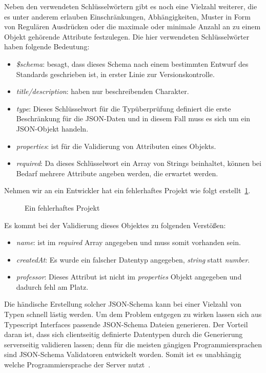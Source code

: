 Neben den verwendeten Schlüsselwörtern gibt es noch eine Vielzahl weiterer, die es unter anderem erlauben Einschränkungen, Abhängigkeiten,
Muster in Form von Regulären Ausdrücken oder die maximale oder minimale Anzahl an zu einem Objekt gehörende Attribute festzulegen.
Die hier verwendeten Schlüsselwörter haben folgende Bedeutung:

\begin{itemize}
    \label{basics:jsonschema:items}
    \item \emph{\$schema}: besagt, dass dieses Schema nach einem bestimmten Entwurf des Standards geschrieben ist, in erster Linie zur Versionskontrolle.
    \item \emph{title/description}: haben nur beschreibenden Charakter.
    \item \emph{type}: Dieses Schlüsselwort für die Typüberprüfung definiert die erste Beschränkung für die JSON-Daten und in diesem Fall muss es sich um ein JSON-Objekt handeln.
    \item \emph{properties}: ist für die Validierung von Attributen eines Objekts.
    \item \emph{required}: Da dieses Schlüsselwort ein Array von Strings beinhaltet, können bei Bedarf mehrere Attribute angeben werden, die erwartet werden.
\end{itemize}

Nehmen wir an ein Entwickler hat ein fehlerhaftes Projekt wie folgt erstellt~\ref{fig:basics:jsonschema:3}.

\begin{figure}[h]
    
    \caption{Ein fehlerhaftes Projekt}
    \label{fig:basics:jsonschema:3}
\end{figure}

Es kommt bei der Validierung dieses Objektes zu folgenden Verstößen:

\begin{itemize}
    \item \emph{name}: ist im \emph{required} Array angegeben und muss somit vorhanden sein.
    \item \emph{createdAt}: Es wurde ein falscher Datentyp angegeben, \emph{string} statt \emph{number}.
    \item \emph{professor}: Dieses Attribut ist nicht im \emph{properties} Objekt angegeben und dadurch fehl am Platz.
\end{itemize}

Die händische Erstellung solcher JSON-Schema kann bei einer Vielzahl von Typen schnell lästig werden.
Um dem Problem entgegen zu wirken lassen sich aus Typescript Interfaces passende JSON-Schema Dateien generieren.
Der Vorteil daran ist, dass sich clientseitig definierte Datentypen durch die Generierung serverseitig validieren lassen;
denn für die meisten gängigen Programmiersprachen sind JSON-Schema Validatoren entwickelt worden.
Somit ist es unabhängig welche Programmiersprache der Server nutzt~\cite{json-schema-implementations}.


